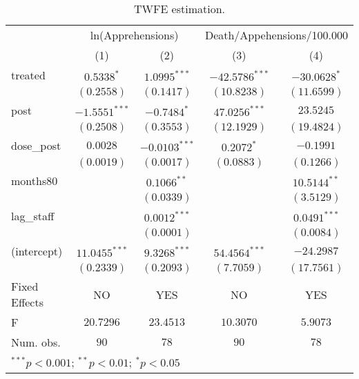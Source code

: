 
\begin{table}
\caption{TWFE estimation.}
\begin{center}
\begin{tabular}{l c c c c}
\hline
 & \multicolumn{2}{c}{ln(Apprehensions)} & \multicolumn{2}{c}{Death/Appehensions/100.000} \\
\cline{2-3} \cline{4-5}
 & (1) & (2) & (3) & (4) \\
\hline
treated       & $0.5338^{*}$    & $1.0995^{***}$  & $-42.5786^{***}$ & $-30.0628^{*}$ \\
              & $(0.2558)$      & $(0.1417)$      & $(10.8238)$      & $(11.6599)$    \\
post          & $-1.5551^{***}$ & $-0.7484^{*}$   & $47.0256^{***}$  & $23.5245$      \\
              & $(0.2508)$      & $(0.3553)$      & $(12.1929)$      & $(19.4824)$    \\
dose\_post    & $0.0028$        & $-0.0103^{***}$ & $0.2072^{*}$     & $-0.1991$      \\
              & $(0.0019)$      & $(0.0017)$      & $(0.0883)$       & $(0.1266)$     \\
months80      &                 & $0.1066^{**}$   &                  & $10.5144^{**}$ \\
              &                 & $(0.0339)$      &                  & $(3.5129)$     \\
lag\_staff    &                 & $0.0012^{***}$  &                  & $0.0491^{***}$ \\
              &                 & $(0.0001)$      &                  & $(0.0084)$     \\
(intercept)   & $11.0455^{***}$ & $9.3268^{***}$  & $54.4564^{***}$  & $-24.2987$     \\
              & $(0.2339)$      & $(0.2093)$      & $(7.7059)$       & $(17.7561)$    \\
\hline
Fixed Effects & NO              & YES             & NO               & YES            \\
F             & $20.7296$       & $23.4513$       & $10.3070$        & $5.9073$       \\
Num. obs.     & $90$            & $78$            & $90$             & $78$           \\
\hline
\multicolumn{5}{l}{\scriptsize{$^{***}p<0.001$; $^{**}p<0.01$; $^{*}p<0.05$}}
\end{tabular}
\label{tab:cw_twfe}
\end{center}
\end{table}
